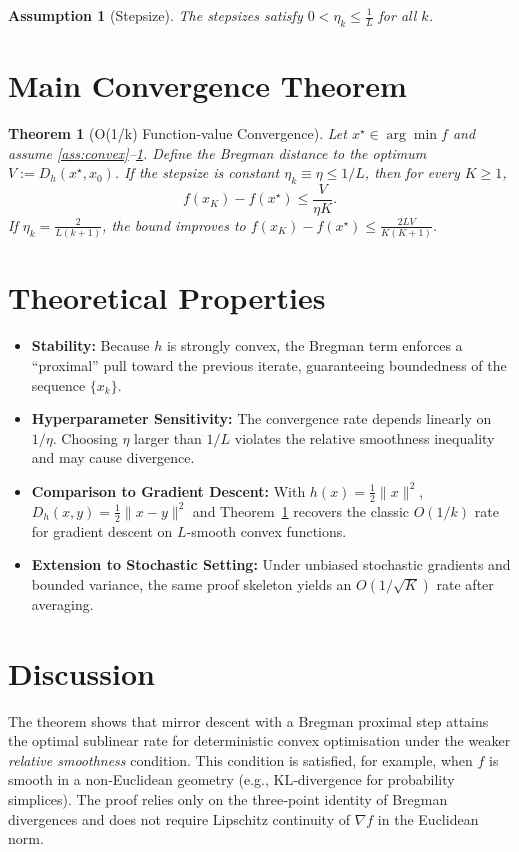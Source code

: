 \documentclass{article}
\newtheorem{theorem}{Theorem}
\newtheorem{assumption}{Assumption}
\newcommand{\grad}{\nabla}
\newcommand{\Breg}[2]{D_h(#1,#2)}
\begin{document}
\begin{assumption}[Stepsize]
\label{ass:stepsize}
The stepsizes satisfy $0<\eta_k\le \frac{1}{L}$ for all $k$.
\end{assumption}

\section*{Main Convergence Theorem}
\begin{theorem}[O(1/k) Function‑value Convergence]
\label{thm:convergence}
Let $x^{\star}\in\arg\min f$ and assume \ref{ass:convex}–\ref{ass:stepsize}.  
Define the Bregman distance to the optimum $V:=\Breg{x^{\star}}{x_0}$.  
If the stepsize is constant $\eta_k\equiv\eta\le 1/L$, then for every $K\ge1$,
\[
f(x_K)-f(x^{\star})\le \frac{V}{\eta K}.
\]
If $\eta_k=\frac{2}{L(k+1)}$, the bound improves to $f(x_K)-f(x^{\star})\le\frac{2LV}{K(K+1)}$.
\end{theorem}

\section*{Theoretical Properties}
\begin{itemize}
\item \textbf{Stability:} Because $h$ is strongly convex, the Bregman term enforces a ``proximal'' pull toward the previous iterate, guaranteeing boundedness of the sequence $\{x_k\}$.
\item \textbf{Hyperparameter Sensitivity:} The convergence rate depends linearly on $1/\eta$. Choosing $\eta$ larger than $1/L$ violates the relative smoothness inequality and may cause divergence.
\item \textbf{Comparison to Gradient Descent:} With $h(x)=\tfrac12\|x\|^2$, $\Breg{x}{y}=\tfrac12\|x-y\|^2$ and Theorem~\ref{thm:convergence} recovers the classic $O(1/k)$ rate for gradient descent on $L$‑smooth convex functions.
\item \textbf{Extension to Stochastic Setting:} Under unbiased stochastic gradients and bounded variance, the same proof skeleton yields an $O(1/\sqrt{K})$ rate after averaging.
\end{itemize}

\section*{Discussion}
The theorem shows that mirror descent with a Bregman proximal step attains the optimal sublinear rate for deterministic convex optimisation under the weaker \emph{relative smoothness} condition. This condition is satisfied, for example, when $f$ is smooth in a non‑Euclidean geometry (e.g., KL‑divergence for probability simplices). The proof relies only on the three‑point identity of Bregman divergences and does not require Lipschitz continuity of $\grad f$ in the Euclidean norm.
\end{document}
